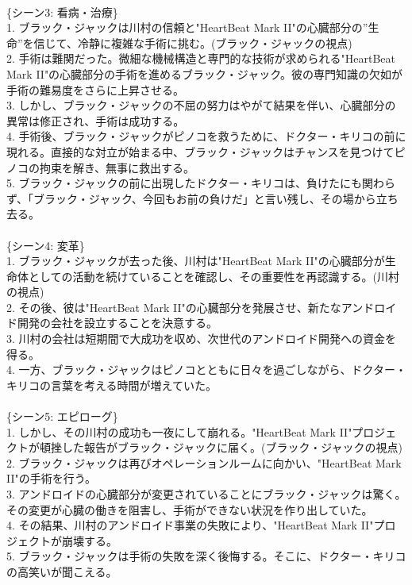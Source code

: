 \documentclass[a4j,12pt]{jsreport}
\begin{document}
\begin{breakitembox}
   \\
   \{シーン3: 看病・治療\}\\
   1. ブラック・ジャックは川村の信頼と"HeartBeat Mark II"の心臓部分の”生命”を信じて、冷静に複雑な手術に挑む。(ブラック・ジャックの視点)\\
   2. 手術は難関だった。微細な機械構造と専門的な技術が求められる"HeartBeat Mark II"の心臓部分の手術を進めるブラック・ジャック。彼の専門知識の欠如が手術の難易度をさらに上昇させる。\\
   3. しかし、ブラック・ジャックの不屈の努力はやがて結果を伴い、心臓部分の異常は修正され、手術は成功する。\\
   4. 手術後、ブラック・ジャックがピノコを救うために、ドクター・キリコの前に現れる。直接的な対立が始まる中、ブラック・ジャックはチャンスを見つけてピノコの拘束を解き、無事に救出する。\\
   5. ブラック・ジャックの前に出現したドクター・キリコは、負けたにも関わらず、「ブラック・ジャック、今回もお前の負けだ」と言い残し、その場から立ち去る。\\
   \\
   \{シーン4: 変革\}\\
   1. ブラック・ジャックが去った後、川村は"HeartBeat Mark II"の心臓部分が生命体としての活動を続けていることを確認し、その重要性を再認識する。(川村の視点)\\
   2. その後、彼は"HeartBeat Mark II"の心臓部分を発展させ、新たなアンドロイド開発の会社を設立することを決意する。\\
   3. 川村の会社は短期間で大成功を収め、次世代のアンドロイド開発への資金を得る。\\
   4. 一方、ブラック・ジャックはピノコとともに日々を過ごしながら、ドクター・キリコの言葉を考える時間が増えていた。\\
   \\
   \{シーン5: エピローグ\}\\
   1. しかし、その川村の成功も一夜にして崩れる。"HeartBeat Mark II"プロジェクトが頓挫した報告がブラック・ジャックに届く。(ブラック・ジャックの視点)\\
   2. ブラック・ジャックは再びオペレーションルームに向かい、"HeartBeat Mark II"の手術を行う。\\
   3. アンドロイドの心臓部分が変更されていることにブラック・ジャックは驚く。その変更が心臓の働きを阻害し、手術ができない状況を作り出していた。\\
   4. その結果、川村のアンドロイド事業の失敗により、"HeartBeat Mark II"プロジェクトが崩壊する。\\
   5. ブラック・ジャックは手術の失敗を深く後悔する。そこに、ドクター・キリコの高笑いが聞こえる。
\end{breakitembox}
\end{document}
